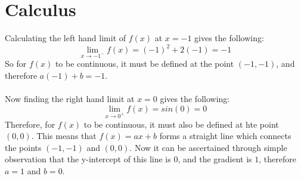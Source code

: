 \documentclass[11pt]{article}
\begin{document}
\section*{Calculus}
Calculating the left hand limit of $f(x)$ at $x=-1$ gives the following:
$$\lim_{x\to -1^-}f(x)=(-1)^2+2(-1)=-1$$
So for $f(x)$ to be continuous, it must be defined at the point $(-1,-1)$, and therefore $a(-1)+b=-1$.
\\\\
Now finding the right hand limit at $x=0$ gives the following:
$$\lim_{x\to 0^+}f(x)=sin(0)=0$$
Therefore, for $f(x)$ to be continuous, it must also be defined at hte point $(0,0)$. This means that $f(x)=ax+b$ forms a straight line which connects the points $(-1,-1)$ and $(0,0)$. Now it can be ascertained through simple observation that the y-intercept of this line is $0$, and the gradient is $1$, therefore $a=1$ and $b=0$.
\end{document}
